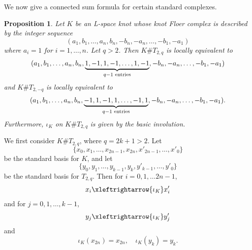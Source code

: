 \documentclass[11pt, reqno]{amsart}
\newtheorem{proposition}[theorem]{Proposition}
\theoremstyle{definition}
\theoremstyle{remark}
\numberwithin{equation}{section}
\begin{document}
We now give a connected sum formula for certain standard complexes. 

\begin{proposition}\label{prop:K+T}
Let $K$ be an L-space knot whose knot Floer complex is described by the integer sequence
\[ (a_1, b_1, \dots, a_n, b_n, -b_n, -a_n, \dots, -b_1, -a_1)\]
where $a_i=1$ for $i=1, \dots, n$. Let $q>2$. Then $K\# T_{2,q}$ is locally equivalent to 
\[ (a_1, b_1, \dots, a_n, b_n, \underbrace{1, -1, 1, -1, \dots, 1, -1}_{q-1\textup{ entries}}, -b_n, -a_n, \dots, -b_1, -a_1)\]
and $K\# T_{2,-q}$ is locally equivalent to 
\[ (a_1, b_1, \dots, a_n, b_n, \underbrace{-1, 1, -1, 1, \dots, -1, 1}_{q-1\textup{ entries}}, -b_n, -a_n, \dots, -b_1, -a_1).\]
Furthermore, $\iota_K$ on $K\# T_{2,q}$ is given by the basic involution.
\end{proposition}


We first consider $K \# T_{2,q}$, where $q = 2k + 1>2$.
Let  
\[
\{x_0, x_1, \dots, x_{2n-1}, x_{2n}, x'_{2n-1}, \dots, x'_0\}
\]  
be the standard basis for $K$, and let  
\[
\{y_0, y_1, \dots, y_{k-1}, y_k, y'_{k-1}, \dots, y'_0\}
\]  
be the standard basis for $T_{2,q}$.  Then for $i=0, 1, \dots 2n-1$,
\[ x_i \xleftrightarrow{\iota_K} x'_i \]
and for $j=0, 1, \dots, k-1$, 
\[ y_j \xleftrightarrow{\iota_K} y'_j \]
and
\[ \iota_K(x_{2n})= x_{2n}, \quad \iota_K(y_k)=y_k. \]
\end{document}
